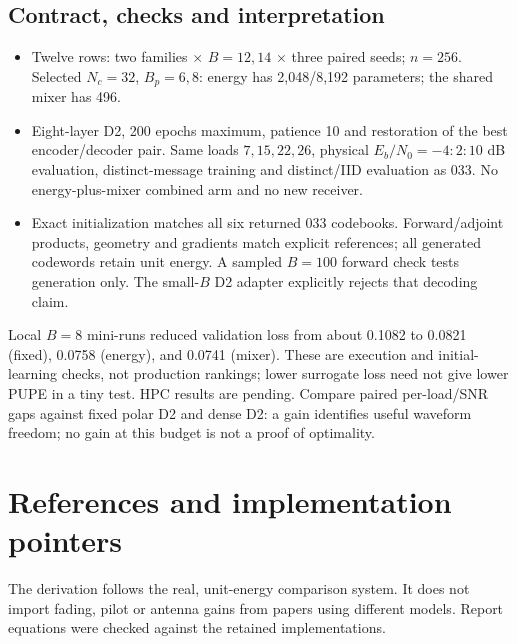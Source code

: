 \documentclass[10pt,a4paper]{article}
\begin{document}
\subsection{Contract, checks and interpretation}
\begin{itemize}
\item Twelve rows: two families $\times$ $B=12,14$ $\times$ three paired seeds; $n=256$.
      Selected $N_c=32$, $B_p=6,8$: energy has 2,048/8,192 parameters; the shared mixer has 496.
\item Eight-layer D2, 200 epochs maximum, patience 10 and restoration of the best encoder/decoder pair.
      Same loads $7,15,22,26$, physical $E_b/N_0=-4{:}2{:}10$ dB evaluation, distinct-message training and distinct/IID
      evaluation as 033. No energy-plus-mixer combined arm and no new receiver.
\item Exact initialization matches all six returned 033 codebooks. Forward/adjoint products, geometry and gradients
      match explicit references; all generated codewords retain unit energy. A sampled $B=100$ forward check tests
      generation only. The small-$B$ D2 adapter explicitly rejects that decoding claim.
\end{itemize}
Local $B=8$ mini-runs reduced validation loss from about 0.1082 to 0.0821 (fixed), 0.0758 (energy), and 0.0741 (mixer).
These are execution and initial-learning checks, not production rankings; lower surrogate loss need not give lower
PUPE in a tiny test. HPC results are pending. Compare paired per-load/SNR gaps against fixed polar D2 and dense D2:
a gain identifies useful waveform freedom; no gain at this budget is not a proof of optimality.

\clearpage
\section*{References and implementation pointers}
The derivation follows the real, unit-energy comparison system. It does not import fading, pilot or antenna gains
from papers using different models. Report equations were checked against the retained implementations.
\end{document}

